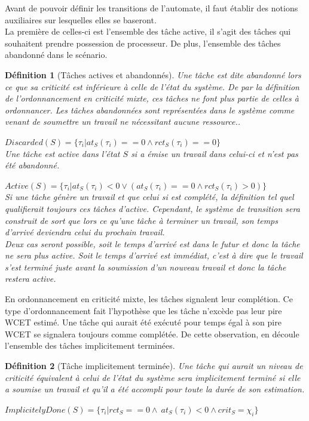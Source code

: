 \documentclass[12pt,a4paper,oneside]{book}
\theoremstyle{break}
\newtheorem{defin}{Définition}[chapter]
\theoremstyle{breakplain}
\begin{document}
Avant de pouvoir définir les transitions de l'automate, il faut établir des notions auxiliaires sur lesquelles elles se baseront.\\
La première de celles-ci est l'ensemble des tâche active, il s'agit des tâches qui souhaitent prendre possession de processeur. De plus, l'ensemble des tâches abandonné dans le scénario. 

\begin{defin}[Tâches actives et abandonnés]
\label{per:actdisc}
Une tâche est dite abandonné lors ce que sa criticité est inférieure à celle de l'état du système. De par la définition de l'ordonnancement en criticité mixte, ces tâches ne font plus partie de celles à ordonnancer. Les tâches abandonnées sont représentées dans le système comme venant de soumettre un travail ne nécessitant aucune ressource..

$Discarded(S) = \{\tau_i | at_S(\tau_i) == 0 \wedge rct_S(\tau_i) == 0\}$\\

Une tâche est active dans l'état $S$ si a émise un travail dans celui-ci et n'est pas été abandonné.

$Active(S) = \{\tau_i | at_S(\tau_i) < 0\vee (at_S(\tau_i) == 0 \wedge rct_S(\tau_i) > 0)\}$\\

Si une tâche génère un travail et que celui si est complété, la définition tel quel qualifierait toujours ces tâches d'active. Cependant, le système de transition sera construit de sort que lors ce qu'une tâche à terminer un travail, son temps d'arrivé deviendra celui du prochain travail.\\
Deux cas seront possible, soit le temps d'arrivé est dans le futur et donc la tâche ne sera plus active. Soit le temps d'arrivé est immédiat, c'est à dire que le travail s'est terminé juste avant la soumission d'un nouveau travail et donc la tâche restera active.
\end{defin}

En ordonnancement en criticité mixte, les tâches signalent leur complétion. Ce type d'ordonnancement fait l'hypothèse que les tâche n'excède pas leur pire WCET estimé. Une tâche qui aurait été exécuté pour temps égal à son pire WCET se signalera toujours comme complétée. De cette observation, en découle l'ensemble des tâches implicitement terminées.

\begin{defin}[Tâche implicitement terminée]
\label{per:impdone}
Une tâche qui aurait un niveau de criticité équivalent à celui de l'état du système sera implicitement terminé si elle a soumise un travail et qu'il a été accompli pour toute la durée de son estimation.

$ImplicitelyDone(S) = \{\tau_i | rct_S == 0 \wedge\ at_S(\tau_i) < 0\wedge crit_S=\chi_i\}$\\
\end{defin}
\end{document}
